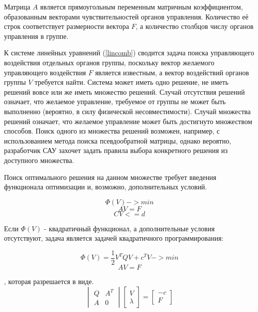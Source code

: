 \documentclass[a4paper]{article}
\begin{document}
Матрица $A$ является прямоугольным переменным матричным коэффициентом, образованным векторами чувствительностей органов управления. Количество её строк соответствует размерности вектора $F$, а количество столбцов числу органов управления в группе.

К системе линейных уравнений (\ref{lincomb}) сводится задача поиска управляющего воздействия отдельных органов группы, поскольку вектор желаемого управляющего воздействия $F$ является известным, а вектор воздействий органов группы $V$ требуется найти. Система может иметь одно решение, не иметь решений вовсе или же иметь множество решений. Случай отсутствия решений означает, что желаемое управление, требуемое от группы не может быть выполненно (вероятно, в силу физической несовместимости). Случай множества решений означает, что желаемое управление может быть достигнуто множеством способов. Поиск одного из множества решений возможен, например, с использованием метода поиска псевдообратной матрицы, однако вероятно, разработчик САУ захочет задать правила выбора конкретного решения из доступного множества.

Поиск оптимального решения на данном множестве требует введения функционала оптимизации и, возможно, дополнительных условий.

\begin{equation}\Phi(V) -> min\end{equation}
\begin{equation}AV = F\end{equation}
\begin{equation}CV <= d\end{equation}

Если $\Phi(V)$ - квадратичный функционал, а дополнительные условия отсутствуют, задача
 является задачей квадратичного программирования:

\begin{equation}\Phi(V) = \frac{1}{2}V^TQV+c^TV -> min\end{equation}
\begin{equation}AV = F\end{equation}

, которая разрешается в виде.
\begin{equation} \label{slau}
\begin{vmatrix}
Q & A^T\\
A & 0
\end{vmatrix}
\begin{bmatrix}
V\\
\lambda
\end{bmatrix}
=
\begin{bmatrix}
-c\\
F
\end{bmatrix}
\end{equation}
\end{document}
